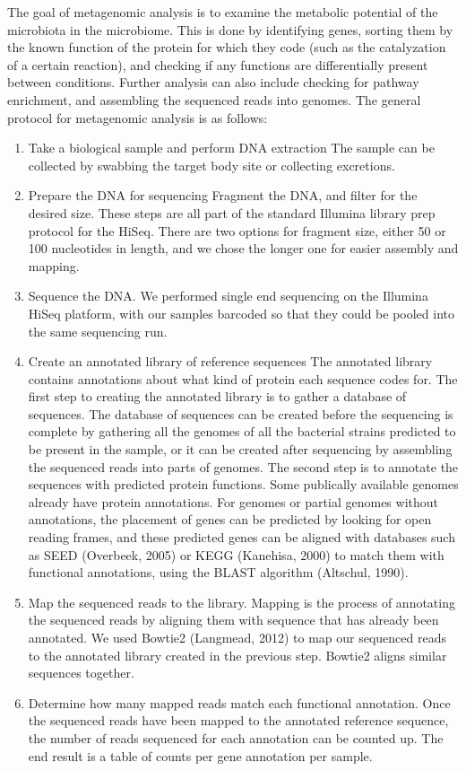 The goal of metagenomic analysis is to examine the metabolic potential of the microbiota in the microbiome. This is done by identifying genes, sorting them by the known function of the protein for which they code (such as the catalyzation of a certain reaction), and checking if any functions are differentially present between conditions. Further analysis can also include checking for pathway enrichment, and assembling the sequenced reads into genomes. The general protocol for metagenomic analysis is as follows:

\begin{enumerate}
\item Take a biological sample and perform DNA extraction
The sample can be collected by swabbing the target body site or collecting excretions.

\item Prepare the DNA for sequencing
Fragment the DNA, and filter for the desired size. These steps are all part of the standard Illumina library prep protocol for the HiSeq. There are two options for fragment size, either 50 or 100 nucleotides in length, and we chose the longer one for easier assembly and mapping.

\item Sequence the DNA.
We performed single end sequencing on the Illumina HiSeq platform, with our samples barcoded so that they could be pooled into the same sequencing run.

\item Create an annotated library of reference sequences
The annotated library contains annotations about what kind of protein each sequence codes for. The first step to creating the annotated library is to gather a database of sequences. The database of sequences can be created before the sequencing is complete by gathering all the genomes of all the bacterial strains predicted to be present in the sample, or it can be created after sequencing by assembling the sequenced reads into parts of genomes. The second step is to annotate the sequences with predicted protein functions. Some publically available genomes already have protein annotations. For genomes or partial genomes without annotations, the placement of genes can be predicted by looking for open reading frames, and these predicted genes can be aligned with databases such as SEED (Overbeek, 2005) or KEGG (Kanehisa, 2000) to match them with functional annotations, using the BLAST algorithm (Altschul, 1990).

\item Map the sequenced reads to the library.
Mapping is the process of annotating the sequenced reads by aligning them with sequence that has already been annotated. We used Bowtie2 (Langmead, 2012) to map our sequenced reads to the annotated library created in the previous step. Bowtie2 aligns similar sequences together.

\item Determine how many mapped reads match each functional annotation.
Once the sequenced reads have been mapped to the annotated reference sequence, the number of reads sequenced for each annotation can be counted up. The end result is a table of counts per gene annotation per sample.
\end{enumerate}

